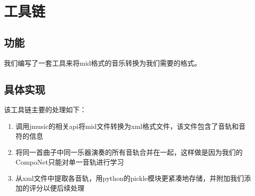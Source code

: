 \documentclass{article}
\begin{document}
  \section{工具链}
  \subsection{功能}
    我们编写了一套工具来将mid格式的音乐转换为我们需要的格式。
  \subsection{具体实现}
    该工具链主要的处理如下：
    \begin{enumerate}
    \item 调用jmusic的相关api将mid文件转换为xml格式文件，该文件包含了音轨和音符的信息
    \item 将同一首曲子中同一乐器演奏的所有音轨合并在一起，这样做是因为我们的CompoNet只能对单一音轨进行学习
    \item 从xml文件中提取各音轨，用python的pickle模块更紧凑地存储，并附加我们添加的评分以便后续处理
    \end{enumerate}
\end{document}
